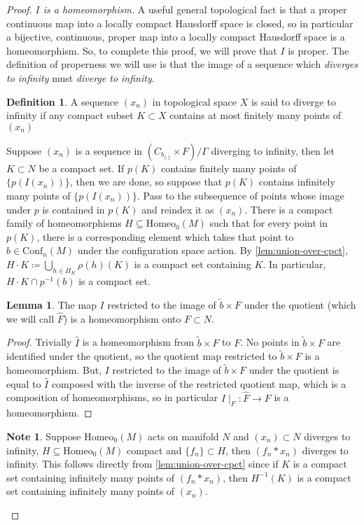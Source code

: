 \documentclass[10pt, oneside]{article}
\newcommand{\homeo}[1][S^1]{\text{Homeo}_0(#1)}
\newcommand{\conf}[2][S^1]{\text{Conf}_{#2}(#1)}
\newcommand{\set}{{\{\cdot\}}}
\newcommand{\maxcov}{C_{b_\set}}
\theoremstyle{definition}
\newtheorem{defn}{Definition}[section]
\newtheorem*{lem*}{Lemma}
\newtheorem*{note*}{Note}
\theoremstyle{definition}
\begin{document}
\begin{proof}
    \medskip
    {\it $I$ is a homeomorphism.} A useful general topological fact is that a proper continuous map into a locally compact Hausdorff space is closed, so in particular a bijective, continuous, proper map into a locally compact Hausdorff space is a homeomorphism. So, to complete this proof, we will prove that $I$ is proper. The definition of properness we will use is that the image of a sequence which {\it diverges to infinity} must {\it diverge to infinity}.
    \begin{defn}
        A sequence $(x_n)$ in topological space $X$ is said to diverge to infinity if any compact subset $K\subset X$ contains at most finitely many points of $(x_n)$
    \end{defn}
    Suppose $(x_n)$ is a sequence in $(\maxcov\times F)/\Gamma$ diverging to infinity, then let $K\subset N$ be a compact set. If $p(K)$ contains finitely many points of $\{p(I(x_n))\}$, then we are done, so suppose that $p(K)$ contains infinitely many points of $\{p(I(x_n))\}$. Pass to the subsequence of points whose image under $p$ is contained in $p(K)$ and reindex it as $(x_n)$.  There is a compact family of homeomorphisms $H\subseteq \homeo[M]$ such that for every point in $p(K)$, there is a corresponding element which takes that point to $b\in\conf[M]{n}$ under the configuration space action. By \cref{lem:union-over-cpct}, $H\cdot K\coloneqq \bigcup_{h\in H_K}\rho(h)(K)$ is a compact set containing $K$. In particular, $H\cdot K\cap p^{-1}(b)$ is a compact set. 

    \begin{lem*}
        The map $I$ restricted to the image of $\tilde{b}\times F$ under the quotient (which we will call $\hat{F}$) is a homeomorphism onto $F\subset N$.
    \end{lem*}
    \begin{proof}
        Trivially $\hat{I}$ is a homeomorphism from $\tilde{b}\times F$ to $F$. 
        No points in $\tilde{b}\times F$ are identified under the quotient, so the quotient map restricted to $\tilde{b}\times F$ is a homeomorphism.
        But, $I$ restricted to the image of $\tilde{b}\times F$ under the quotient is equal to 
        $\hat{I}$ composed with the inverse of the restricted quotient map, which is a composition of homeomorphisms, so in particular 
        $I\mid_{\hat{F}}: \hat{F} \to F$ is a homeomorphism. 
    \end{proof}

    \begin{note*}
        Suppose $\homeo[M]$ acts on manifold $N$ and $(x_n)\subset N$ diverges to infinity, $H\subseteq\homeo[M]$ compact and $\{f_n\}\subset H$, then $(f_n*x_n)$ diverges to infinity. This follows directly from \cref{lem:union-over-cpct} since if $K$ is a compact set containing infinitely many points of $(f_n*x_n)$, then $H^{-1}(K)$ is a compact set containing infinitely many points of $(x_n)$.
    \end{note*}


\end{proof}
\end{document}
